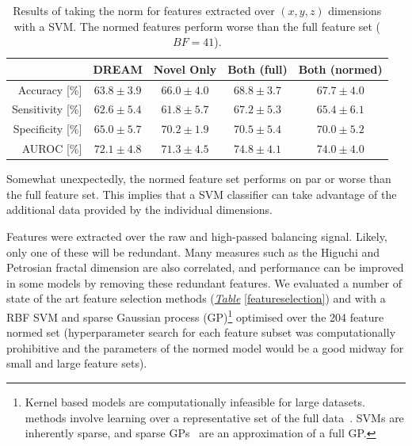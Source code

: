 \documentclass[12pt, twoside]{book}
\renewcommand\emph[1]{\textit{\color{USred}{#1}}}
\begin{document}
\begin{table}[!htb]
	\caption{Results of taking the norm for features extracted over $(x,y,z)$ dimensions with a SVM. The normed features perform worse than the full feature set ($BF=41$).}
	\label{accelerometernorm}
	\centering
	\begin{tabular}{@{}rcccc@{}}
		&  DREAM & Novel Only & Both (full) & Both (normed) \\ \midrule
		Accuracy [\%]    &      $63.8\pm3.9$ &                       $66.0\pm4.0$                                  &     $68.8\pm3.7$
		&						$67.7\pm4.0$\\ \midrule
		Sensitivity [\%] &      $62.6\pm5.4$ &                       $61.8\pm5.7$                                  &     $67.2\pm5.3$
		&					    $65.4\pm6.1$\\ \midrule
		Specificity [\%] &      $65.0\pm5.7$ &                       $70.2\pm1.9$                                  &     $70.5\pm5.4$
		&					    $70.0\pm5.2$\\ \midrule
		AUROC [\%]         &      $72.1\pm4.8$ &                       $71.3\pm4.5$                                  &     $74.8\pm4.1$
		&				 		$74.0\pm4.0$\\ \midrule
	\end{tabular}
\end{table}

Somewhat unexpectedly, the normed feature set performs on par or worse than the full feature set. This implies that a SVM classifier can take advantage of the additional data provided by the individual dimensions. 


Features were extracted over the raw and high-passed balancing signal. Likely, only one of these will be redundant. Many measures such as the Higuchi and Petrosian fractal dimension are also correlated, and performance can be improved in some models by removing these redundant features. We evaluated a number of state of the art feature selection methods (\textit{\hyperref[featureselection]{Table}} \ref{featureselection}) and with a RBF SVM and sparse Gaussian process (GP)\footnote{Kernel based models are computationally infeasible for large datasets. \emph{Sparse} methods involve learning over a representative set of the full data~\cite{sparsematrix}. SVMs are inherently sparse, and sparse GPs~\cite{sparsegp} are an approximation of a full GP.} optimised over the 204 feature normed set (hyperparameter search for each feature subset was computationally prohibitive and the parameters of the normed model would be a good midway for small and large feature sets).
\end{document}
